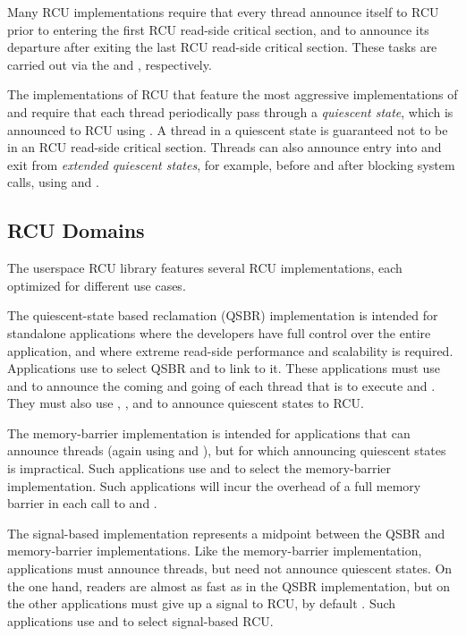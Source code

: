 \documentclass[letterpaper,10pt]{article}
\begin{document}
Many RCU implementations require that every thread announce itself to
RCU prior to entering the first RCU read-side critical section, and
to announce its departure after exiting the last RCU read-side
critical section.
These tasks are carried out via the  and
, respectively.

The implementations of RCU that feature the most aggressive implementations of
 and  require that each thread
periodically pass through a \emph{quiescent state}, which is announced to RCU
using .
A thread in a quiescent state is guaranteed not to be in an RCU
read-side critical section.
Threads can also announce entry into and exit from \emph{extended
quiescent states}, for example, before and after blocking system
calls, using  and .

\subsection{RCU Domains}
\label{sec:RCU Domains}

The userspace RCU library features several RCU implementations, each
optimized for different use cases.

The quiescent-state based reclamation (QSBR) implementation is intended
for standalone applications where the developers have full control
over the entire application, and where extreme read-side performance
and scalability is required.
Applications use  to select QSBR and
 to link to it.
These applications must use  and
 to announce the coming and going
of each thread that is to execute  and
.
They must also use , ,
and  to announce quiescent states to RCU.

The memory-barrier implementation is intended for applications that
can announce threads (again using  and
), but for which announcing quiescent states is
impractical.
Such applications use  and
 to select the memory-barrier implementation.
Such applications will incur the overhead of a full memory barrier in
each call to  and .

The signal-based implementation represents a midpoint between the QSBR
and memory-barrier implementations.
Like the memory-barrier implementation, applications must announce
threads, but need not announce quiescent states.
On the one hand, readers are almost as fast as in the QSBR implementation,
but on the other applications must give up a signal to RCU, by default
.
Such applications use  and
 to select signal-based RCU.
\end{document}
